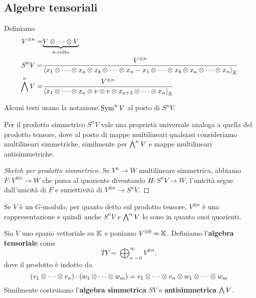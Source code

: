 \subsection{Algebre tensoriali}
\begin{definition}
Definiamo
\begin{align*}
V^{\otimes n}=&\underset{n\text{-volte}}{\underbrace{V\otimes\cdots\otimes V}}\\
S^nV=&\frac{V^{\otimes n}}{\left\langle {x_1\otimes\cdots\otimes x_a\otimes x_b\otimes\cdots\otimes x_n-x_1\otimes\cdots\otimes x_b\otimes x_a\otimes\cdots\otimes x_n}\right\rangle_{\mathbb{K}}}\\
\bigwedge^nV=&\frac{V^{\otimes n}}{\left\langle {x_1\otimes\cdots\otimes x_a\otimes v\otimes v\otimes x_{a+3}\otimes\cdots\otimes x_n}\right\rangle_{\mathbb{K}}}
\end{align*}
\end{definition}
\begin{remark}
Alcuni testi usano la notazione $\operatorname{Sym}^n V$ al posto di $S^nV$.
\end{remark}

\begin{remark}
Per il prodotto simmetrico $S^nV$ vale una propriet\`a universale analoga a quella del prodotto tensore, dove al posto di mappe multilineari qualsiasi consideriamo multilineari simmetriche, similmente per $\bigwedge^nV$ e mappe multilineari antisimmetriche.
\end{remark}
\begin{proof}[Sketch per prodotto simmetrico]
Se $V^n\to W$ multilineare simmetrica, abbiamo $F:V^{\otimes n}\to W$ che passa al quoziente diventando $H:S^nV\to W$, l'unicit\`a segue dall'unicit\`a di $F$ e suriettivit\`a di $V^{\otimes n}\to S^nV$.
\end{proof}

\begin{remark}
Se $V$ \`e un $G$-modulo, per quanto detto sul prodotto tensore, $V^{\otimes n}$ \`e una rappresentazione e quindi anche $S^nV$ e $\bigwedge^n V$ lo sono in quanto suoi quozienti.
\end{remark}


\begin{definition}
Sia $V$ uno spazio vettoriale su $\mathbb{K}$ e poniamo $V^{\otimes 0}=\mathbb{K}$. Definiamo l'\textbf{algebra tensoriale} come
\[TV=\bigoplus_{n=0}^\infty V^{\otimes n},\]
dove il prodotto \`e indotto da
\[\left({v_1\otimes\cdots\otimes v_n}\right)\cdot\left({w_1\otimes\cdots\otimes w_m}\right)=v_1\otimes\cdots\otimes v_n\otimes w_1\otimes\cdots\otimes w_m\]
Similmente costruiamo l'\textbf{algebra simmetrica} $SV$ e \textbf{antisimmetrica} $\bigwedge V$.
\end{definition}

